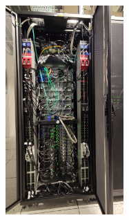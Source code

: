 \documentclass[10pt]{beamer}
\begin{document}
\begin{frame}[label=tme]
\begin{columns}
\begin{column}{7cm}
    \end{column}
    \begin{column}{4cm}
    \includegraphics[height=8cm]{cluster.jpg}
  \end{column}
\end{columns}
\end{frame}

\end{document}
